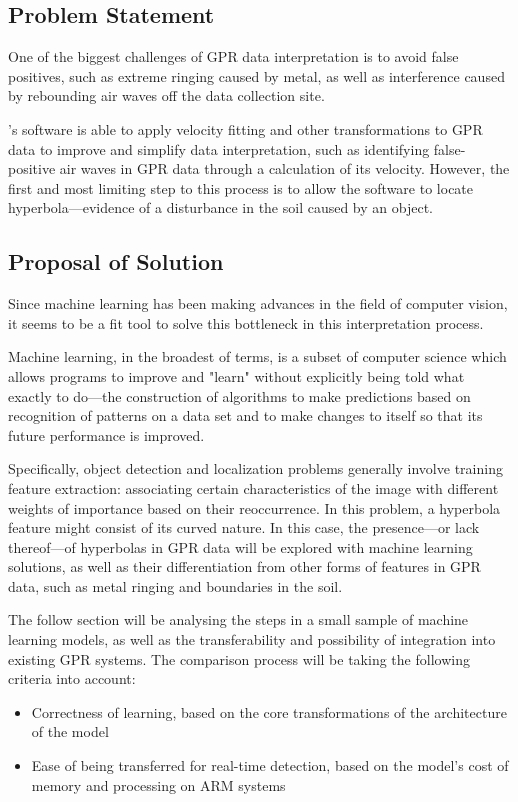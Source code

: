 \documentclass[se,blockletter]{uw-wkrpt}
\begin{document}
\subsection{Problem Statement}
One of the biggest challenges of GPR data interpretation is to avoid false positives, such as extreme ringing caused by metal, 
as well as interference caused by rebounding air waves off the data collection site.

\thecompany{}'s software is able to apply velocity fitting and other transformations to GPR data to improve and simplify data interpretation, such as identifying false-positive air waves in GPR data through a calculation of its velocity. However, the first and most limiting step to this process is to allow the software to locate hyperbola---evidence of a disturbance in the soil caused by an object.

\subsection{Proposal of Solution}
Since machine learning has been making advances in the field of computer vision, it seems to be a fit tool to solve this bottleneck in this interpretation process.

Machine learning, in the broadest of terms, is a subset of computer science which allows programs to improve and "learn" without explicitly being told what exactly to do---the construction of algorithms to make predictions based on recognition of patterns on a data set and to make changes to itself so that its future performance is improved. 

Specifically, object detection and localization problems generally involve training feature extraction: associating certain characteristics of the image with different weights of importance based on their reoccurrence. In this problem, a hyperbola feature might consist of its curved nature. In this case, the presence---or lack thereof---of hyperbolas in GPR data will be explored with machine learning solutions, as well as their differentiation from other forms of features in GPR data, such as metal ringing and boundaries in the soil.

The follow section will be analysing the steps in a small sample of machine learning models, as well as the transferability and possibility of integration into existing GPR systems. The comparison process will be taking the following criteria into account:
\begin{itemize}
\item Correctness of learning, based on the core transformations of the architecture of the model
\item Ease of being transferred for real-time detection, based on the model's cost of memory and processing on ARM systems
\end{itemize} 
\end{document}
